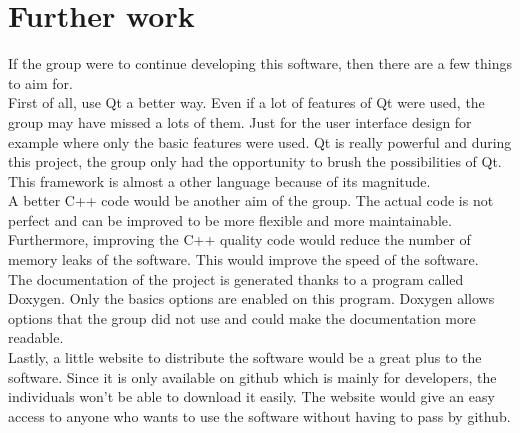 \chapter{Further work}
If the group were to continue developing this software, then there are a few things to aim for.\\
First of all, use Qt a better way. Even if a lot of features of Qt were used, the group may have missed a lots of them. Just for the user interface design for example where only the basic features were used. Qt is really powerful and during this project, the group only had the opportunity to brush the possibilities of Qt. This framework is almost a other language because of its magnitude.\\
A better C++ code would be another aim of the group. The actual code is not perfect and can be improved to be more flexible and more maintainable. Furthermore, improving the C++ quality code would reduce the number of memory leaks of the software. This would improve the speed of the software.\\
The documentation of the project is generated thanks to a program called Doxygen. Only the basics options are enabled on this program. Doxygen allows options that the group did not use and could make the documentation more readable.\\
Lastly, a little website to distribute the software would be a great plus to the software. Since it is only available on github which is mainly for developers, the individuals won't be able to download it easily. The website would give an easy access to anyone who wants to use the software without having to pass by github.\\
